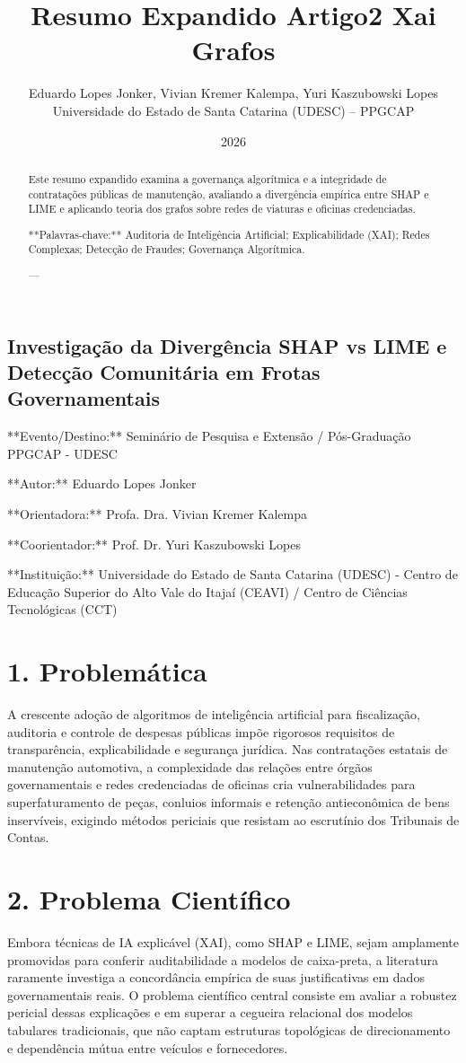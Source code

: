 \documentclass[10pt,a4paper,journal]{article}
\title{Resumo Expandido Artigo2 Xai Grafos}
\author{Eduardo Lopes Jonker, Vivian Kremer Kalempa, Yuri Kaszubowski Lopes\\ \small Universidade do Estado de Santa Catarina (UDESC) -- PPGCAP}
\date{2026}
\begin{document}
\maketitle

\subsection{Investigação da Divergência SHAP vs LIME e Detecção Comunitária em Frotas Governamentais}
**Evento/Destino:** Seminário de Pesquisa e Extensão / Pós-Graduação PPGCAP - UDESC

**Autor:** Eduardo Lopes Jonker

**Orientadora:** Profa. Dra. Vivian Kremer Kalempa

**Coorientador:** Prof. Dr. Yuri Kaszubowski Lopes

**Instituição:** Universidade do Estado de Santa Catarina (UDESC) - Centro de Educação Superior do Alto Vale do Itajaí (CEAVI) / Centro de Ciências Tecnológicas (CCT)

\begin{abstract}
Este resumo expandido examina a governança algorítmica e a integridade de contratações públicas de manutenção, avaliando a divergência empírica entre SHAP e LIME e aplicando teoria dos grafos sobre redes de viaturas e oficinas credenciadas.

**Palavras-chave:** Auditoria de Inteligência Artificial; Explicabilidade (XAI); Redes Complexas; Detecção de Fraudes; Governança Algorítmica.

---

\end{abstract}

\section{1. Problemática}
A crescente adoção de algoritmos de inteligência artificial para fiscalização, auditoria e controle de despesas públicas impõe rigorosos requisitos de transparência, explicabilidade e segurança jurídica. Nas contratações estatais de manutenção automotiva, a complexidade das relações entre órgãos governamentais e redes credenciadas de oficinas cria vulnerabilidades para superfaturamento de peças, conluios informais e retenção antieconômica de bens inservíveis, exigindo métodos periciais que resistam ao escrutínio dos Tribunais de Contas.

\section{2. Problema Científico}
Embora técnicas de IA explicável (XAI), como SHAP e LIME, sejam amplamente promovidas para conferir auditabilidade a modelos de caixa-preta, a literatura raramente investiga a concordância empírica de suas justificativas em dados governamentais reais. O problema científico central consiste em avaliar a robustez pericial dessas explicações e em superar a cegueira relacional dos modelos tabulares tradicionais, que não captam estruturas topológicas de direcionamento e dependência mútua entre veículos e fornecedores.
\end{document}
